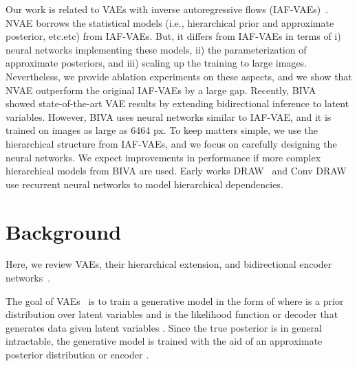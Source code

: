 \documentclass{article}
\begin{document}
Our work is related to VAEs with inverse autoregressive flows (IAF-VAEs)~\cite{kingma2016improved}. NVAE borrows the statistical models (i.e., hierarchical prior and approximate posterior, etc.etc) from IAF-VAEs. But, it differs from IAF-VAEs in terms of i) neural networks implementing these models, ii) the parameterization of approximate posteriors, and iii) scaling up the training to large images. Nevertheless, we provide ablation experiments on these aspects, and we show that NVAE outperform the original IAF-VAEs by a large gap. Recently, BIVA~\cite{maaloe2019biva} showed state-of-the-art VAE results by extending bidirectional inference to latent variables. However, BIVA uses neural networks similar to IAF-VAE, and it is trained on images as large as 6464 px. To keep matters simple, we use the hierarchical structure from IAF-VAEs, and we focus on carefully designing the neural networks. We expect improvements in performance if more complex hierarchical models from BIVA are used. Early works DRAW~\cite{gregor2015draw} and Conv DRAW~\cite{gregor2016ConvDraw} use recurrent neural networks to model hierarchical dependencies.
 \vspace{-0.5cm}
\section{Background}\label{sec:bg}
Here, we review VAEs, their hierarchical extension, and bidirectional encoder networks~\cite{kingma2016improved, sonderby2016ladder}.

The goal of VAEs~\cite{kingma2014vae} is to train a generative model in the form of  where  is a prior distribution over latent variables  and  is the likelihood function or decoder that generates data  given latent variables . Since the true posterior  is in general intractable, the generative model is trained with the aid of an approximate posterior distribution or encoder .
\end{document}
